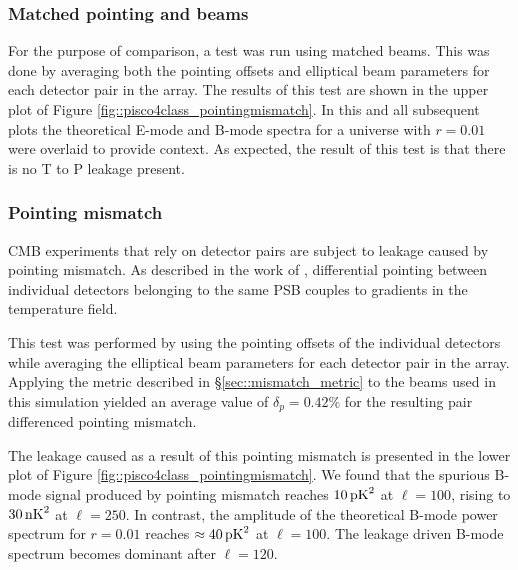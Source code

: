 \documentclass[a4paper,11pt]{article}
\begin{document}
\subsubsection{Matched pointing and beams}

For the purpose of comparison, a test was run using matched beams. This was done by averaging both the pointing offsets and elliptical beam parameters for each detector pair in the array. The results of this test are shown in the upper plot of Figure \ref{fig::pisco4class_pointingmismatch}. In this and all subsequent plots the theoretical E-mode and B-mode spectra for a universe with $r=0.01$ were overlaid to provide context. As expected, the result of this test is that there is no T to P leakage present.   


\subsubsection{Pointing mismatch}

CMB experiments that rely on detector pairs are subject to leakage caused by pointing mismatch. As described in the work of \cite{2007MNRAS.376.1767O}, differential pointing between individual detectors belonging to the same PSB couples to gradients in the temperature field.

This test was performed by using the pointing offsets of the individual detectors while averaging the elliptical beam parameters for each detector pair in the array. Applying the metric described in \S\ref{sec::mismatch_metric} to the beams used in this simulation yielded an average value of $\delta_p = 0.42\%$ for the resulting pair differenced pointing mismatch. 

The leakage caused as a result of this pointing mismatch is presented in the lower plot of Figure \ref{fig::pisco4class_pointingmismatch}. We found that the spurious B-mode signal produced by pointing mismatch reaches $10 \, \rm{pK}^2$ at $\ell=100$, rising to $30 \, \rm{nK}^2$ at $\ell=250$. In contrast, the amplitude of the theoretical B-mode power spectrum for $r=0.01$ reaches $\approx 40 \, \rm{pK}^2$ at $\ell=100$. The leakage driven B-mode spectrum becomes dominant after $\ell=120$.

\end{document}
